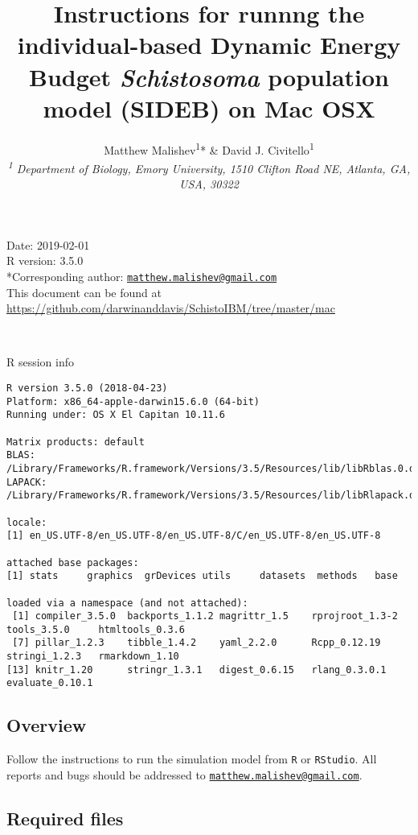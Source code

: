 \documentclass[10,portrait]{article}
\title{Instructions for runnng the individual-based Dynamic Energy Budget
\emph{Schistosoma} population model (SIDEB) on Mac OSX}
\author{Matthew Malishev\textsuperscript{1}* \& David J.
Civitello\textsuperscript{1}\\[2\baselineskip]\emph{\textsuperscript{1}
Department of Biology, Emory University, 1510 Clifton Road NE, Atlanta,
GA, USA, 30322}}
\date{}
\begin{document}
\maketitle

{
\hypersetup{linkcolor=black}
\setcounter{tocdepth}{4}
\tableofcontents
}
\newpage   

Date: 2019-02-01\\
R version: 3.5.0\\
*Corresponding author:
\href{mailto:matthew.malishev@gmail.com}{\nolinkurl{matthew.malishev@gmail.com}}\\
This document can be found at
\url{https://github.com/darwinanddavis/SchistoIBM/tree/master/mac}

~

R session info

\begin{verbatim}
R version 3.5.0 (2018-04-23)
Platform: x86_64-apple-darwin15.6.0 (64-bit)
Running under: OS X El Capitan 10.11.6

Matrix products: default
BLAS: /Library/Frameworks/R.framework/Versions/3.5/Resources/lib/libRblas.0.dylib
LAPACK: /Library/Frameworks/R.framework/Versions/3.5/Resources/lib/libRlapack.dylib

locale:
[1] en_US.UTF-8/en_US.UTF-8/en_US.UTF-8/C/en_US.UTF-8/en_US.UTF-8

attached base packages:
[1] stats     graphics  grDevices utils     datasets  methods   base     

loaded via a namespace (and not attached):
 [1] compiler_3.5.0  backports_1.1.2 magrittr_1.5    rprojroot_1.3-2 tools_3.5.0     htmltools_0.3.6
 [7] pillar_1.2.3    tibble_1.4.2    yaml_2.2.0      Rcpp_0.12.19    stringi_1.2.3   rmarkdown_1.10 
[13] knitr_1.20      stringr_1.3.1   digest_0.6.15   rlang_0.3.0.1   evaluate_0.10.1
\end{verbatim}

\newpage  

\subsection{Overview}\label{overview}

Follow the instructions to run the simulation model from \texttt{R} or
\texttt{RStudio}. All reports and bugs should be addressed to
\href{mailto:matthew.malishev@gmail.com}{\nolinkurl{matthew.malishev@gmail.com}}.

\subsection{Required files}\label{required-files}
\end{document}
